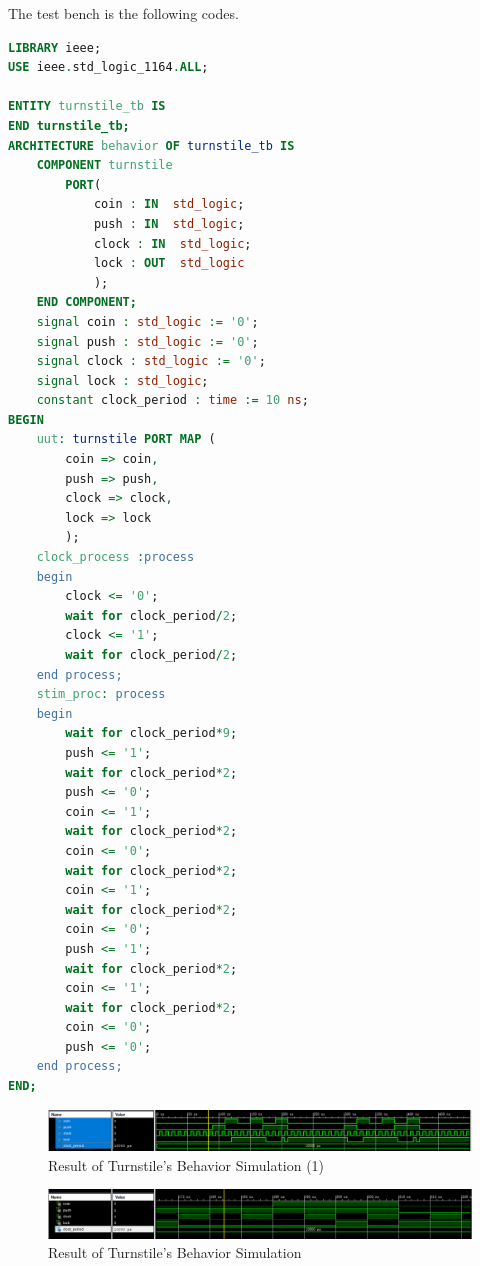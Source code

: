 \documentclass{article}
\begin{document}
    The test bench is the following codes.
    
    \begin{lstlisting}[language=VHDL,caption=Turnstile Test Bench]
LIBRARY ieee;
USE ieee.std_logic_1164.ALL;

ENTITY turnstile_tb IS
END turnstile_tb;
ARCHITECTURE behavior OF turnstile_tb IS 
    COMPONENT turnstile
        PORT(
            coin : IN  std_logic;
            push : IN  std_logic;
            clock : IN  std_logic;
            lock : OUT  std_logic
            );
    END COMPONENT;
    signal coin : std_logic := '0';
    signal push : std_logic := '0';
    signal clock : std_logic := '0';
    signal lock : std_logic;
    constant clock_period : time := 10 ns;
BEGIN
    uut: turnstile PORT MAP (
        coin => coin,
        push => push,
        clock => clock,
        lock => lock
        );
    clock_process :process
    begin
        clock <= '0';
        wait for clock_period/2;
        clock <= '1';
        wait for clock_period/2;
    end process;
    stim_proc: process
    begin
        wait for clock_period*9;
        push <= '1';
        wait for clock_period*2;
        push <= '0';
        coin <= '1';
        wait for clock_period*2;
        coin <= '0';
        wait for clock_period*2;
        coin <= '1';
        wait for clock_period*2;
        coin <= '0';
        push <= '1';
        wait for clock_period*2;
        coin <= '1';
        wait for clock_period*2;
        coin <= '0';
        push <= '0';
    end process;
END;

    \end{lstlisting}
   
   \begin{figure}[h]
        \centering
        \includegraphics[width=1\linewidth]{homework7-9}
        \caption{Result of Turnstile's Behavior Simulation (1)}
        \label{fig:homework7-9}
    \end{figure}

    \begin{figure}[h]
        \centering
        \includegraphics[width=1\linewidth]{homework7-10}
        \caption{Result of Turnstile's Behavior Simulation}
        \label{fig:homework7-10}
    \end{figure}
    
\end{document}
